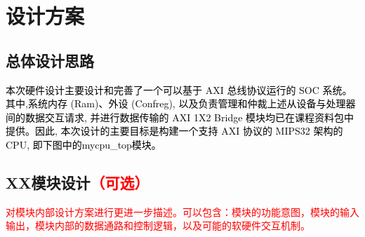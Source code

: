 \section{设计方案}
\subsection{总体设计思路}
\textcolor{black}{本次硬件设计主要设计和完善了一个可以基于 AXI 总线协议运行的 SOC 系统。其中,系统内存 (Ram)、外设 (Confreg), 以及负责管理和仲裁上述从设备与处理器间的数据交互请求, 并进行数据传输的 AXI 1X2 Bridge 模块均已在课程资料包中提供。因此, 本次设计的主要目标是构建一个支持 AXI 协议的 MIPS32 架构的 CPU, 即下图中的mycpu\_top模块。}
\subsection{XX模块设计\textcolor{red}{（可选）}}

\textcolor{red}{对模块内部设计方案进行更进一步描述。可以包含：模块的功能意图，模块的输入输出，模块内部的数据通路和控制逻辑，以及可能的软硬件交互机制。}